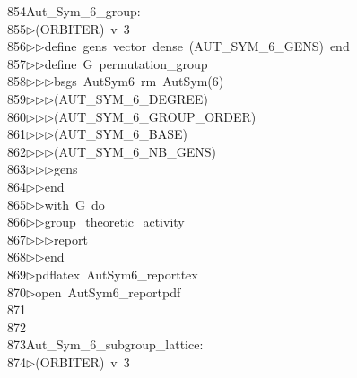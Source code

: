 \begin{tabbing}
854\>Aut\_Sym\_6\_group:\\[0pt]
855\>$\triangleright$\>(ORBITER)\ v\ 3\ \\[0pt]
856\>$\triangleright$\>$\triangleright$\>define\ gens\ vector\ dense\ (AUT\_SYM\_6\_GENS)\ end\ \\[0pt]
857\>$\triangleright$\>$\triangleright$\>define\ G\ permutation\_group\ \\[0pt]
858\>$\triangleright$\>$\triangleright$\>$\triangleright$\>bsgs\ AutSym6\ rm\ AutSym(6)\ \\[0pt]
859\>$\triangleright$\>$\triangleright$\>$\triangleright$\>(AUT\_SYM\_6\_DEGREE)\ \\[0pt]
860\>$\triangleright$\>$\triangleright$\>$\triangleright$\>(AUT\_SYM\_6\_GROUP\_ORDER)\ \\[0pt]
861\>$\triangleright$\>$\triangleright$\>$\triangleright$\>(AUT\_SYM\_6\_BASE)\ \\[0pt]
862\>$\triangleright$\>$\triangleright$\>$\triangleright$\>(AUT\_SYM\_6\_NB\_GENS)\ \\[0pt]
863\>$\triangleright$\>$\triangleright$\>$\triangleright$\>gens\ \\[0pt]
864\>$\triangleright$\>$\triangleright$\>end\ \\[0pt]
865\>$\triangleright$\>$\triangleright$\>with\ G\ do\ \\[0pt]
866\>$\triangleright$\>$\triangleright$\>group\_theoretic\_activity\ \\[0pt]
867\>$\triangleright$\>$\triangleright$\>$\triangleright$\>report\ \\[0pt]
868\>$\triangleright$\>$\triangleright$\>end\\[0pt]
869\>$\triangleright$\>pdflatex\ AutSym6\_reporttex\\[0pt]
870\>$\triangleright$\>open\ AutSym6\_reportpdf\\[0pt]
871\>\\[0pt]
872\>\\[0pt]
873\>Aut\_Sym\_6\_subgroup\_lattice:\\[0pt]
874\>$\triangleright$\>(ORBITER)\ v\ 3\ \\[0pt]

\end{tabbing}

